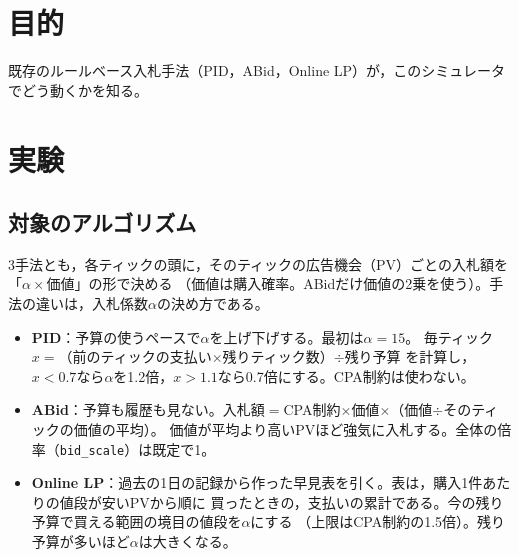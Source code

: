 \documentclass[twocolumn, 10pt]{ujarticle}
\begin{document}
\beginverification

\section{目的}\label{sec:e-purpose}

既存のルールベース入札手法（PID，ABid，Online LP）が，このシミュレータでどう動くかを知る。

\section{実験}\label{sec:e-exp}

\subsection{対象のアルゴリズム}\label{sec:e-algo}

3手法とも，各ティックの頭に，そのティックの広告機会（PV）ごとの入札額を「$\alpha\times$価値」の形で決める
（価値は購入確率。ABidだけ価値の2乗を使う）。手法の違いは，入札係数$\alpha$の決め方である。
\begin{itemize}[leftmargin=1.2em, itemsep=0pt, topsep=2pt]
\item \textbf{PID}：予算の使うペースで$\alpha$を上げ下げする。最初は$\alpha=15$。
  毎ティック $x=$（前のティックの支払い$\times$残りティック数）$\div$残り予算 を計算し，
  $x<0.7$なら$\alpha$を1.2倍，$x>1.1$なら0.7倍にする。CPA制約は使わない。
\item \textbf{ABid}：予算も履歴も見ない。入札額$=$CPA制約$\times$価値$\times$（価値$\div$そのティックの価値の平均）。
  価値が平均より高いPVほど強気に入札する。全体の倍率（\texttt{bid\_scale}）は既定で1。
\item \textbf{Online LP}：過去の1日の記録から作った早見表を引く。表は，購入1件あたりの値段が安いPVから順に
  買ったときの，支払いの累計である。今の残り予算で買える範囲の境目の値段を$\alpha$にする
  （上限はCPA制約の1.5倍）。残り予算が多いほど$\alpha$は大きくなる。
\end{itemize}
\end{document}
